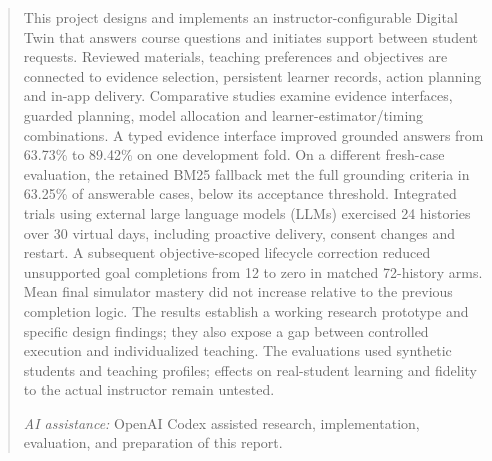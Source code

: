 \begin{abstract}
This project designs and implements an instructor-configurable Digital Twin
that answers course questions and initiates support between student requests.
Reviewed materials, teaching preferences and objectives are connected to
evidence selection, persistent learner records, action planning and in-app
delivery. Comparative studies examine evidence interfaces, guarded planning,
model allocation and learner-estimator/timing combinations. A typed
evidence interface improved grounded answers from 63.73\% to 89.42\% on one
development fold. On a different fresh-case evaluation, the retained BM25
fallback met the full grounding criteria in 63.25\% of answerable cases, below
its acceptance threshold. Integrated trials using external large language models (LLMs) exercised 24 histories
over 30 virtual days, including proactive delivery, consent changes and
restart. A subsequent objective-scoped lifecycle correction reduced unsupported
goal completions from 12 to zero in matched 72-history arms. Mean final
simulator mastery did not increase relative to the previous completion logic. The results establish a working research prototype and
specific design findings; they also expose a gap between controlled execution
and individualized teaching. The evaluations used synthetic students and teaching profiles; effects on
real-student learning and fidelity to the actual instructor remain untested.
\par\smallskip
\noindent\textit{AI assistance:} OpenAI Codex assisted research, implementation,
evaluation, and preparation of this report.
\end{abstract}
